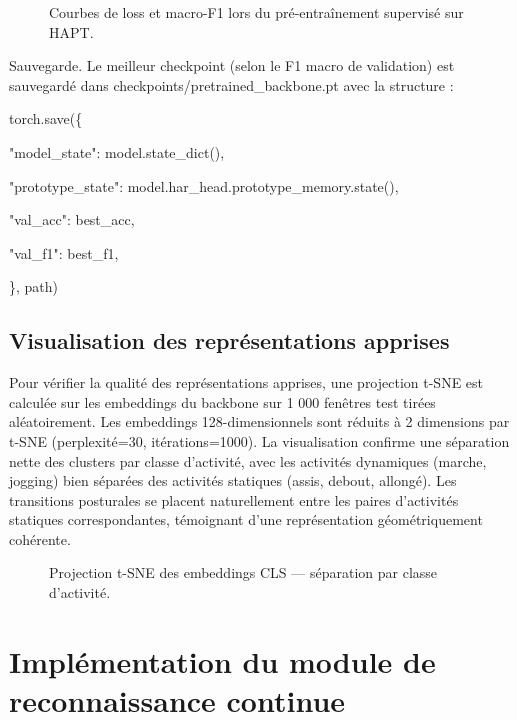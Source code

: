 \begin{figure}[H]
  \centering
  \caption[Courbes de pré-entraînement]{Courbes de loss et macro-F1 lors du pré-entraînement
  supervisé sur HAPT.}
  \label{fig:pretrain_impl}
\end{figure}

Sauvegarde. Le meilleur checkpoint (selon le F1 macro de validation) est sauvegardé dans checkpoints/pretrained\_backbone.pt avec la structure :

torch.save(\{

"model\_state":      model.state\_dict(),

"prototype\_state":  model.har\_head.prototype\_memory.state(),

"val\_acc":          best\_acc,

"val\_f1":           best\_f1,

\}, path)

\subsection{Visualisation des représentations apprises}

Pour vérifier la qualité des représentations apprises, une projection t-SNE est calculée sur les embeddings du backbone sur 1 000 fenêtres test tirées aléatoirement. Les embeddings 128-dimensionnels sont réduits à 2 dimensions par t-SNE (perplexité=30, itérations=1000). La visualisation confirme une séparation nette des clusters par classe d'activité, avec les activités dynamiques (marche, jogging) bien séparées des activités statiques (assis, debout, allongé). Les transitions posturales se placent naturellement entre les paires d'activités statiques correspondantes, témoignant d'une représentation géométriquement cohérente.

\begin{figure}[H]
  \centering
  \caption[Projection t-SNE des embeddings]{Projection t-SNE des embeddings CLS — séparation
  par classe d'activité.}
  \label{fig:tsne_impl}
\end{figure}

\section{Implémentation du module de reconnaissance continue}

